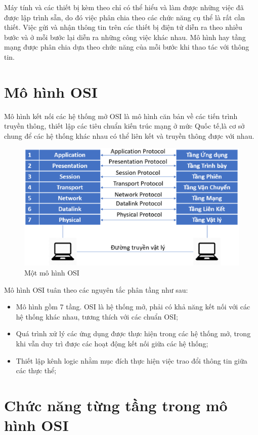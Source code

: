\documentclass[9pt,twocolumn,twoside,lineno]{gsajnl}
\begin{document}
Máy tính và các thiết bị kèm theo chỉ có thể hiểu và làm được những việc đã được lập trình sẵn, do đó việc phân chia theo các chức năng cụ thể là rất cần thiết. Việc gửi và nhận thông tin trên các thiết bị điện tử diễn ra theo nhiều bước và ở mỗi bước lại diễn ra những công việc khác nhau. Mô hình hay tầng mạng được phân chia dựa theo chức năng của mỗi bước khi thao tác với thông tin.


\section{Mô hình OSI}

Mô hình kết nối các hệ thống mở OSI là mô hình căn bản về các tiến trình truyền thông, thiết lập các tiêu chuẩn kiến trúc mạng ở mức Quốc tế,\;là cơ sở chung để các hệ thống khác nhau có thể liên kết và truyền thông được với nhau.

\begin{figure}[h]
  \centering
  \includegraphics[scale=0.3]{q3_1}
  \caption{Một mô hình OSI}
\end{figure}

Mô hình OSI tuân theo các nguyên tắc phân tầng như sau:
\begin{itemize}
  \item Mô hình gồm 7 tầng. OSI là hệ thống mở, phải có khả năng kết nối với các hệ thống khác nhau, tương thích với các chuẩn OSI;
  \item Quá trình xử lý các ứng dụng được thực hiện trong các hệ thống mở, trong khi vẫn duy trì được các hoạt động kết nối giữa các hệ thống;
  \item Thiết lập kênh logic nhằm mục đích thực hiện việc trao đổi thông tin giữa các thực thể;
\end{itemize}
\section{Chức năng từng tầng trong mô hình OSI}
\end{document}
